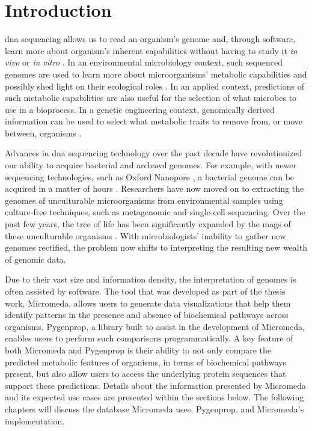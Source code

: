 \chapter{Introduction} \label{introduction}

\gls{dna} sequencing allows us to read an organism's genome and, through 
software, learn more about organism's inherent capabilities without having to 
study it \textit{in vivo} or \textit{in vitro} \cite{de2012bioinformatic}. In an 
environmental microbiology context, such sequenced genomes are used to learn 
more about microorganisms' metabolic capabilities and possibly shed light on 
their ecological roles \cite{de2012bioinformatic}. In an applied context, 
predictions of such metabolic capabilities are also useful for the selection of 
what microbes to use in a bioprocess. In a genetic engineering context, 
genomically derived information can be used to select what metabolic traits to 
remove from, or move between, organisms 
\cite{strohl2001biochemical,sanchez2005novel}.

Advances in \gls{dna} sequencing technology over the past decade have 
revolutionized our ability to acquire bacterial and archaeal genomes. For 
example, with newer sequencing technologies, such as Oxford Nanopore 
\cite{jain2016oxford}, a bacterial genome can be acquired in a matter of hours 
\cite{Lu2016,Cao2017}. Researchers have now moved on to extracting the genomes 
of unculturable microorganisms from environmental samples using culture-free 
techniques, such as metagenomic \cite{quince2017shotgun} and single-cell 
\cite{gawad2016single} sequencing. Over the past few years, the tree of life has 
been significantly expanded by the \gls{mags} \cite{bowers2017minimum} of these 
unculturable organisms \cite{Hug2016,Parks2017}. With microbiologists' inability 
to gather new genomes rectified, the problem now shifts to interpreting the 
resulting new wealth of genomic data.

Due to their vast size and information density, the interpretation of genomes is 
often assisted by software. The tool that was developed as part of the thesis 
work, Micromeda, allows users to generate data visualizations that help them 
identify patterns in the presence and absence of biochemical pathways across 
organisms. Pygenprop, a library built to assist in the development of Micromeda, 
enables users to perform such comparisons programmatically. A key feature of 
both Micromeda and Pygenprop is their ability to not only compare the predicted 
metabolic features of organisms, in terms of biochemical pathways present, but 
also allow users to access the underlying protein sequences that support these 
predictions. Details about the information presented by Micromeda and its 
expected use cases are presented within the sections below. The following 
chapters will discuss the database Micromeda uses, Pygenprop, and Micromeda's 
implementation.

